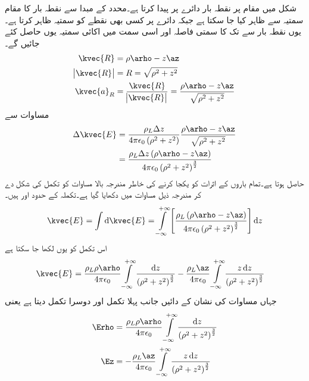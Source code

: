 شکل  میں مقام  پر نقطہ بار   دائرے پر  پیدا کرتا ہے۔محدد کے مبدا سے نقطہ بار کا مقام سمتیہ  سے ظاہر کیا جا سکتا ہے جبکہ دائرے پر کسی بھی نقطے  کو سمتیہ  ظاہر کرتا ہے۔یوں نقطہ بار سے   تک کا سمتی فاصلہ اور اسی سمت میں اکائی سمتیہ یوں حاصل کئے جائیں گے۔
\begin{align*}
\kvec{R}&=\rho \arho-z\az\\
\abs{\kvec{R}}&=R=\sqrt{\rho^2+z^2}\\
\kvec{a}_R&=\frac{\kvec{R}}{\abs{\kvec{R}}}=\frac{\rho \arho-z\az}{\sqrt{\rho^2+z^2}}
\end{align*}
مساوات  سے
\begin{align*}
\Delta \kvec{E}&=\frac{\rho_L \Delta z}{4 \pi \epsilon_0 \left(\rho^2+z^2 \right)} \frac{\rho \arho-z\az}{\sqrt{\rho^2+z^2}}\\
&=\frac{\rho_L \Delta z \left(\rho \arho-z\az \right)}{4 \pi \epsilon_0\left(\rho^2+z^2 \right)^{\frac{3}{2}}}
\end{align*}
حاصل ہوتا ہے۔تمام باروں کے اثرات کو یکجا کرنے کی خاطر مندرجہ بالا مساوات کو تکمل کی شکل دے کر مندرجہ ذیل مساوات میں دکھایا گیا ہے۔تکملہ کے حدود  اور   ہیں۔
\begin{align}
\kvec{E}=\int \dif  \kvec{E}=\int\limits_{-\infty}^{+\infty} \left[\frac{\rho_L \left(\rho \arho-z\az \right)}{4 \pi \epsilon_0\left(\rho^2+z^2 \right)^{\frac{3}{2}}}\right] \dif z
\end{align}
اس تکمل کو یوں لکھا جا سکتا ہے
\begin{align}\label{مساوات_کولمب_لامحدود_لکیر_بار_کا_میدان}
\kvec{E}&=\frac{\rho_L \rho \arho}{4 \pi \epsilon_0}\int\limits_{-\infty}^{+\infty} \frac{\dif z }{\left(\rho^2+z^2 \right)^{\frac{3}{2}}} -\frac{\rho_L \az}{4 \pi \epsilon_0}\int\limits_{-\infty}^{+\infty} \frac{z \dif z}{\left(\rho^2+z^2 \right)^{\frac{3}{2}}}
\end{align}
جہاں مساوات کی نشان کے دائیں جانب پہلا تکمل  \Erho اور دوسرا تکمل \Ez دیتا ہے  یعنی
\begin{gather}
\begin{aligned}\label{مساوات_کولمب_رداسی_اور_عمودی_برقی_میدان}
\Erho&=\frac{\rho_L \rho \arho}{4 \pi \epsilon_0}\int\limits_{-\infty}^{+\infty} \frac{\dif z }{\left(\rho^2+z^2 \right)^{\frac{3}{2}}}\\
\Ez&=-\frac{\rho_L \az}{4 \pi \epsilon_0}\int\limits_{-\infty}^{+\infty} \frac{z \dif z}{\left(\rho^2+z^2 \right)^{\frac{3}{2}}}
\end{aligned}
\end{gather}

